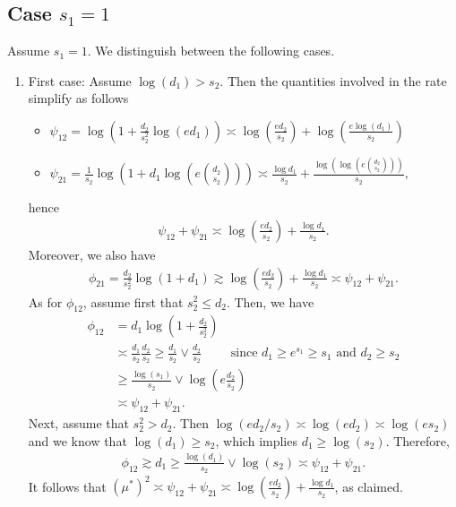 \documentclass{article}
\theoremstyle{remark}
\begin{document}
\subsection{Case $s_1 = 1$}

Assume $s_1 = 1$. We distinguish between the following cases.

\begin{enumerate}
    \item First case: Assume $\log(d_1) > s_2$. Then the quantities involved in the rate simplify as follows
    \begin{itemize}
        \item $\psi_{12} = \log\left(1+\frac{d_2}{s_2^2}\log(ed_1)\right) \asymp \log\left(\frac{ed_2}{s_2}\right) + \log\left(\frac{e\log(d_1)}{s_2}\right)$
        \item $\psi_{21} = \frac{1}{s_2} \log\left(1+d_1 \log(e{d_2 \choose s_2})\right) \asymp \frac{\log d_1}{s_2} + \frac{\log(\log(e{d_2 \choose s_2}))}{s_2},$
    \end{itemize}
    hence 
    \begin{align*}
        \psi_{12} + \psi_{21} \asymp \log\left(\frac{ed_2}{s_2}\right) + \frac{\log d_1}{s_2}.
    \end{align*}
    Moreover, we also have
    \begin{align*}
        \phi_{21} = \frac{d_2}{s_2^2}\log(1+d_1) \gtrsim \log\left(\frac{ed_2}{s_2}\right) + \frac{\log d_1}{s_2} \asymp \psi_{12} + \psi_{21}.
    \end{align*}
    As for $\phi_{12}$, assume first that $s_2^2 \leq d_2$. Then, we have
      \begin{align*}
        \phi_{12} &= d_1 \log\left(1+\frac{d_2}{s_2^2}\right) \\
        &\asymp \frac{d_1}{s_2} \frac{d_2}{s_2} \geq \frac{d_1}{s_2} \lor \frac{d_2}{s_2} \qquad  \text{ since } d_1 \geq e^{s_1} \geq s_1 \text{ and } d_2 \geq s_2\\
        &\geq \frac{\log(s_1)}{s_2} \lor \log(e\frac{d_2}{s_2}) \\
        &\asymp \psi_{12} + \psi_{21}.
    \end{align*}
    Next, assume that $s_2^2 > d_2$. Then $\log(ed_2/s_2) \asymp \log(ed_2) \asymp \log(es_2)$ and we know that $\log(d_1) \geq s_2$, which implies $d_1 \geq \log(s_2)$. Therefore, 
    \begin{align*}
        \phi_{12} \gtrsim d_1 \geq \frac{\log(d_1)}{s_2} \lor \log(s_2) \asymp \psi_{12} + \psi_{21}.
    \end{align*}
    It follows that $(\mu^*)^2 \asymp \psi_{12} + \psi_{21} \asymp \log\left(\frac{ed_2}{s_2}\right) + \frac{\log d_1}{s_2}$, as claimed. 


\end{enumerate}
\end{document}
